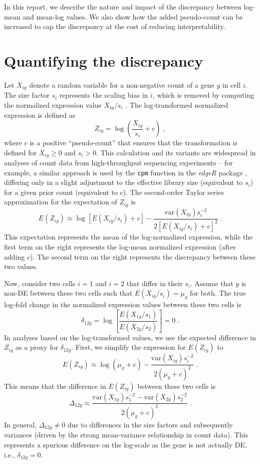 \documentclass[10pt,letterpaper]{article}
\newcommand\code[1]{{\small\texttt{#1}}}
\begin{document}
In this report, we describe the nature and impact of the discrepancy between log-mean and mean-log values.
We also show how the added pseudo-count can be increased to cap the discrepancy at the cost of reducing interpretability.

\section{Quantifying the discrepancy}
Let $X_{ig}$ denote a random variable for a non-negative count of a gene $g$ in cell $i$.
The size factor $s_i$ represents the scaling bias in $i$, which is removed by computing the normalized expression value $X_{ig}/s_i$ \cite{anders2010differential}.
The log-transformed normalized expression is defined as 
\[
Z_{ig} = \log\left(\frac{X_{ig}}{s_i}+ c\right) \;,
\]
where $c$ is a positive ``pseudo-count'' that ensures that the transformation is defined for $X_{ig} \ge 0$ and $s_i > 0$.
This calculation and its variants are widespread in analyses of count data from high-throughput sequencing experiments -- for example, a similar approach is used by the \code{cpm} function in the \textit{edgeR} package \cite{robinson2010edgeR}, differing only in a slight adjustment to the effective library size (equivalent to $s_i$) for a given prior count (equivalent to $c$).
The second-order Taylor series approximation for the expectation of $Z_{ig}$ is
\[
E(Z_{ig}) \approx \log[E(X_{ig}/s_i) + c] - \frac{\mbox{var}(X_{ig})s_i^{-2}}{2[E(X_{ig}/s_i) + c]^2} \;.
\]
This expectation represents the mean of the log-normalized expression, while the first term on the right represents the log-mean normalized expression (after adding $c$). 
The second term on the right represents the discrepancy between these two values.

Now, consider two cells $i=1$ and $i=2$ that differ in their $s_i$.
Assume that $g$ is non-DE between these two cells such that $E(X_{ig}/s_i)=\mu_g$ for both.
The true log-fold change in the normalized expression values between these two cells is
\[
\delta_{12g} = \log\left[ \frac{E(X_{1g}/s_1)}{E(X_{2g}/s_2)} \right] = 0 \;.
\]
In analyses based on the log-transformed values, we use the expected difference in $Z_{ig}$ as a proxy for $\delta_{12g}$.
First, we simplify the expression for $E(Z_{ig})$ to
\[
E(Z_{ig}) \approx \log(\mu_g + c) - \frac{\mbox{var}(X_{ig})s_i^{-2}}{2(\mu_g + c)^2} \;.
\]
This means that the difference in $E(Z_{ig})$ between these two cells is 
\begin{equation}
\Delta_{12g} \approx \frac{\mbox{var}(X_{1g})s_1^{-2} -  \mbox{var}(X_{2g})s_2^{-2}}{2(\mu_g + c)^2} \;. \label{eqn:spuriousdiff}
\end{equation}
In general, $\Delta_{12g} \neq 0$ due to differences in the size factors and subsequently variances (driven by the strong mean-variance relationship in count data).
This represents a spurious difference on the log-scale as the gene is not actually DE, i.e., $\delta_{12g}=0$.
\end{document}
